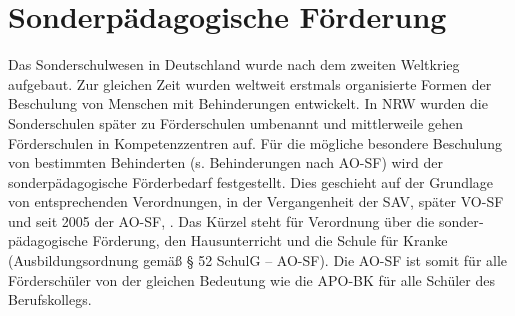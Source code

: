 


\section{Sonderpädagogische Förderung}
Das Sonderschulwesen in Deutschland wurde nach dem zweiten Weltkrieg aufgebaut. Zur gleichen Zeit wurden weltweit erstmals organisierte Formen der Beschulung von Menschen mit Behinderungen entwickelt. In NRW wurden die Sonderschulen später zu Förder­schulen umbenannt und mittlerweile gehen Förder­schulen in Kompetenz­zentren auf. Für die mögliche besondere Beschulung von bestimmten Be­hinderten (s. Behinderungen nach AO-SF) wird der sonderpädagogische Förder­bedarf festgestellt. Dies geschieht auf der Grund­lage von entsprechenden Verordnungen, in der Vergangenheit der SAV, später VO-SF und seit 2005 der AO-SF, \cite{AOSF:05}. Das Kürzel steht für Ver­ord­nung über die sonder­pädagogische Förderung, den Hausunterricht und die Schule für Kranke (Ausbildungsordnung gemäß § 52 SchulG – AO-SF). Die AO-SF ist somit für alle Förderschüler von der gleichen Bedeutung wie die APO-BK für alle Schüler des Berufskollegs.
